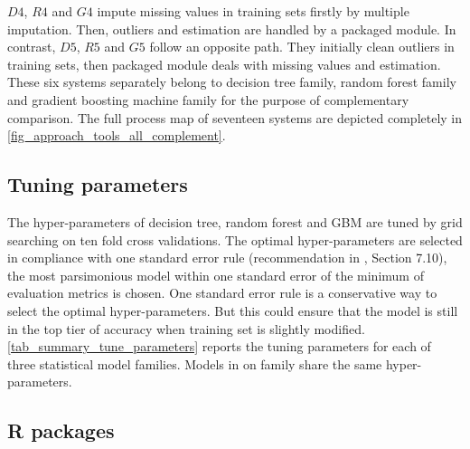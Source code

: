 \documentclass[12pt,a4paper]{article}
\begin{document}
\noindent $D4$, $R4$ and $G4$ impute missing values in training sets firstly by multiple imputation. Then, outliers and estimation are handled by a packaged module. In contrast, $D5$, $R5$ and $G5$ follow an opposite path. They initially clean outliers in training sets, then packaged module deals with missing values and estimation. These six systems separately belong to decision tree family, random forest family and gradient boosting machine family for the purpose of complementary comparison. The full process map of seventeen systems are depicted completely in \autoref{fig_approach_tools_all_complement}.  

%
\begin{quote}
\end{quote}
%

\subsection{Tuning parameters}

The hyper-parameters of decision tree, random forest and GBM are tuned by grid searching on ten fold cross validations. The optimal hyper-parameters are selected in compliance with one standard error rule (recommendation in \citet{Hastie2009}, Section 7.10), the most parsimonious model within one standard error of the minimum of evaluation metrics is chosen. One standard error rule is a conservative way to select the optimal hyper-parameters. But this could ensure that the model is still in the top tier of accuracy when training set is slightly modified. \autoref{tab_summary_tune_parameters} reports the tuning parameters for each of three statistical model families. Models in on family share the same hyper-parameters.

%
\begin{quote}
\end{quote}
%

\subsection{\textsf{R} packages}
\end{document}
